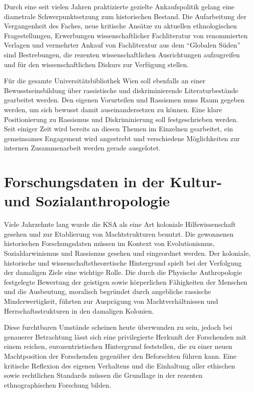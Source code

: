 \documentclass[a4paper,
fontsize=11pt,
oneside,
numbers=noperiodatend,
parskip=half-,
bibliography=totoc,
final
]{scrartcl}
\begin{document}
Durch eine seit vielen Jahren praktizierte gezielte Ankaufspolitik
gelang eine diametrale Schwerpunktsetzung zum historischen Bestand. Die
Aufarbeitung der Vergangenheit des Faches, neue kritische Ansätze zu
aktuellen ethnologischen Fragestellungen, Erwerbungen wissenschaftlicher
Fachliteratur von renommierten Verlagen und vermehrter Ankauf von
Fachliteratur aus dem \enquote{Globalen Süden} sind Bestrebungen, die
rezenten wissenschaftlichen Ausrichtungen aufzugreifen und für den
wissenschaftlichen Diskurs zur Verfügung stellen.

Für die gesamte Universitätsbibliothek Wien soll ebenfalls an einer
Bewusstseinsbildung über rassistische und diskriminierende
Literaturbestände gearbeitet werden. Den eigenen Vorurteilen und
Rassismen muss Raum gegeben werden, um sich bewusst damit
auseinandersetzen zu können. Eine klare Positionierung zu Rassismus und
Diskriminierung soll festgeschrieben werden. Seit einiger Zeit wird
bereits an diesen Themen im Einzelnen gearbeitet, ein gemeinsames
Engagement wird angestrebt und verschiedene Möglichkeiten zur internen
Zusammenarbeit werden gerade ausgelotet.

\hypertarget{forschungsdaten-in-der-kultur--und-sozialanthropologie}{%
\section{Forschungsdaten in der Kultur- und
Sozialanthropologie}\label{forschungsdaten-in-der-kultur--und-sozialanthropologie}}

Viele Jahrzehnte lang wurde die KSA als eine Art koloniale
Hilfswissenschaft gesehen und zur Etablierung von Machtstrukturen
benutzt. Die gewonnenen historischen Forschungsdaten müssen im Kontext
von Evolutionismus, Sozialdarwinismus und Rassismus gesehen und
eingeordnet werden. Der koloniale, historische und
wissenschaftstheoretische Hintergrund spielt bei der Verfolgung der
damaligen Ziele eine wichtige Rolle. Die durch die Physische
Anthropologie festgelegte Bewertung der geistigen sowie körperlichen
Fähigkeiten der Menschen und die Ausbeutung, moralisch begründet durch
angebliche rassische Minderwertigkeit, führten zur Ausprägung von
Machtverhältnissen und Herrschaftsstrukturen in den damaligen Kolonien.

Diese furchtbaren Umstände scheinen heute überwunden zu sein, jedoch bei
genauerer Betrachtung lässt sich eine privilegierte Herkunft der
Forschenden mit einem reichen, eurozentristischen Hintergrund
feststellen, die zu einer neuen Machtposition der Forschenden gegenüber
den Beforschten führen kann. Eine kritische Reflexion des eigenen
Verhaltens und die Einhaltung aller ethischen sowie rechtlichen
Standards müssen die Grundlage in der rezenten ethnographischen
Forschung bilden.
\end{document}
